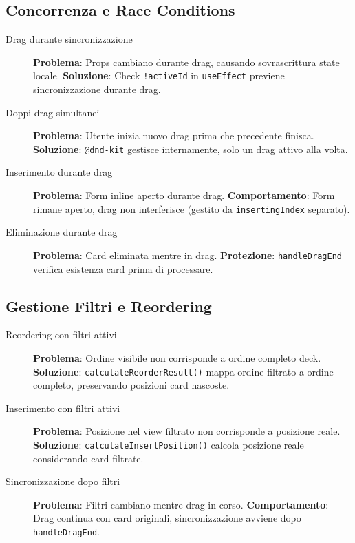 \documentclass[11pt,a4paper]{article}
\begin{document}
\subsection{Concorrenza e Race Conditions}

\begin{description}
    \item[Drag durante sincronizzazione] \textbf{Problema}: Props cambiano durante drag, causando sovrascrittura state locale. \textbf{Soluzione}: Check \texttt{!activeId} in \texttt{useEffect} previene sincronizzazione durante drag.
    
    \item[Doppi drag simultanei] \textbf{Problema}: Utente inizia nuovo drag prima che precedente finisca. \textbf{Soluzione}: \texttt{@dnd-kit} gestisce internamente, solo un drag attivo alla volta.
    
    \item[Inserimento durante drag] \textbf{Problema}: Form inline aperto durante drag. \textbf{Comportamento}: Form rimane aperto, drag non interferisce (gestito da \texttt{insertingIndex} separato).
    
    \item[Eliminazione durante drag] \textbf{Problema}: Card eliminata mentre in drag. \textbf{Protezione}: \texttt{handleDragEnd} verifica esistenza card prima di processare.
\end{description}

\subsection{Gestione Filtri e Reordering}

\begin{description}
    \item[Reordering con filtri attivi] \textbf{Problema}: Ordine visibile non corrisponde a ordine completo deck. \textbf{Soluzione}: \texttt{calculateReorderResult()} mappa ordine filtrato a ordine completo, preservando posizioni card nascoste.
    
    \item[Inserimento con filtri attivi] \textbf{Problema}: Posizione nel view filtrato non corrisponde a posizione reale. \textbf{Soluzione}: \texttt{calculateInsertPosition()} calcola posizione reale considerando card filtrate.
    
    \item[Sincronizzazione dopo filtri] \textbf{Problema}: Filtri cambiano mentre drag in corso. \textbf{Comportamento}: Drag continua con card originali, sincronizzazione avviene dopo \texttt{handleDragEnd}.
\end{description}
\end{document}
